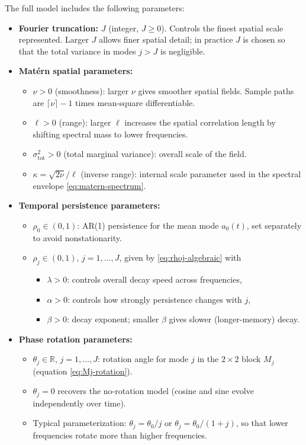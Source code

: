 \documentclass[answers,12pt,addpoints]{exam}
\begin{document}
The full model includes the following parameters:

\begin{itemize}
  \item \textbf{Fourier truncation:} $J$ (integer, $J\ge 0$). Controls the finest spatial scale represented. Larger $J$ allows finer spatial detail; in practice $J$ is chosen so that the total variance in modes $j > J$ is negligible.

  \item \textbf{Matérn spatial parameters:}
    \begin{itemize}
      \item $\nu > 0$ (smoothness): larger $\nu$ gives smoother spatial fields. Sample paths are $\lceil \nu \rceil - 1$ times mean-square differentiable.
      \item $\ell > 0$ (range): larger $\ell$ increases the spatial correlation length by shifting spectral mass to lower frequencies.
      \item $\sigma^2_{\text{tot}} > 0$ (total marginal variance): overall scale of the field.
      \item $\kappa = \sqrt{2\nu}/\ell$ (inverse range): internal scale parameter used in the spectral envelope \eqref{eq:matern-spectrum}.
    \end{itemize}

  \item \textbf{Temporal persistence parameters:}
    \begin{itemize}
      \item $\rho_0 \in (0,1)$: AR(1) persistence for the mean mode $a_0(t)$, set separately to avoid nonstationarity.
      \item $\rho_j \in (0,1)$, $j=1,\dots,J$, given by \eqref{eq:rhoj-algebraic} with
        \begin{itemize}
          \item $\lambda > 0$: controls overall decay speed across frequencies,
          \item $\alpha > 0$: controls how strongly persistence changes with $j$,
          \item $\beta > 0$: decay exponent; smaller $\beta$ gives slower (longer-memory) decay.
        \end{itemize}
    \end{itemize}

  \item \textbf{Phase rotation parameters:}
    \begin{itemize}
      \item $\theta_j \in \mathbb{R}$, $j=1,\dots,J$: rotation angle for mode $j$ in the $2\times2$ block $M_j$ (equation \eqref{eq:Mj-rotation}).
      \item $\theta_j = 0$ recovers the no-rotation model (cosine and sine evolve independently over time).
      \item Typical parameterization: $\theta_j = \theta_0 / j$ or $\theta_j = \theta_0 / (1 + j)$, so that lower frequencies rotate more than higher frequencies.
    \end{itemize}


\end{itemize}
\end{document}
